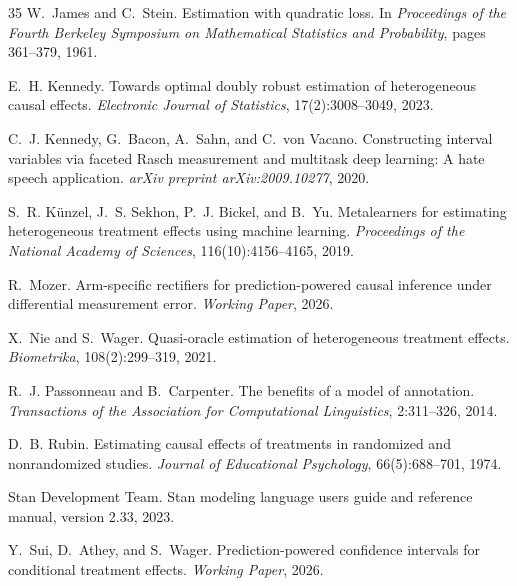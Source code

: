 \documentclass[11pt,twocolumn]{article}
\theoremstyle{remark}
\begin{document}
\begin{thebibliography}{35}
W.~James and C.~Stein.
\newblock Estimation with quadratic loss.
\newblock In \emph{Proceedings of the Fourth Berkeley Symposium on Mathematical Statistics and Probability}, pages 361--379, 1961.

E.~H. Kennedy.
\newblock Towards optimal doubly robust estimation of heterogeneous causal effects.
\newblock \emph{Electronic Journal of Statistics}, 17(2):3008--3049, 2023.

C.~J. Kennedy, G.~Bacon, A.~Sahn, and C.~von Vacano.
\newblock Constructing interval variables via faceted Rasch measurement and multitask deep learning: A hate speech application.
\newblock \emph{arXiv preprint arXiv:2009.10277}, 2020.

S.~R. K\"{u}nzel, J.~S. Sekhon, P.~J. Bickel, and B.~Yu.
\newblock Metalearners for estimating heterogeneous treatment effects using machine learning.
\newblock \emph{Proceedings of the National Academy of Sciences}, 116(10):4156--4165, 2019.

R.~Mozer.
\newblock Arm-specific rectifiers for prediction-powered causal inference under differential measurement error.
\newblock \emph{Working Paper}, 2026.

X.~Nie and S.~Wager.
\newblock Quasi-oracle estimation of heterogeneous treatment effects.
\newblock \emph{Biometrika}, 108(2):299--319, 2021.

R.~J. Passonneau and B.~Carpenter.
\newblock The benefits of a model of annotation.
\newblock \emph{Transactions of the Association for Computational Linguistics}, 2:311--326, 2014.

D.~B. Rubin.
\newblock Estimating causal effects of treatments in randomized and nonrandomized studies.
\newblock \emph{Journal of Educational Psychology}, 66(5):688--701, 1974.

{Stan Development Team}.
\newblock Stan modeling language users guide and reference manual, version 2.33, 2023.

Y.~Sui, D.~Athey, and S.~Wager.
\newblock Prediction-powered confidence intervals for conditional treatment effects.
\newblock \emph{Working Paper}, 2026.


\end{thebibliography}
\end{document}
